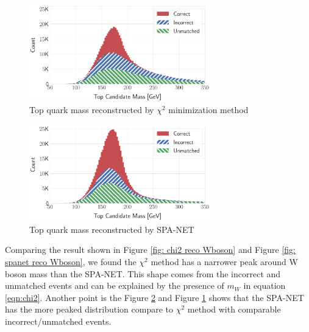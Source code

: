 \begin{figure}[H]
	\centering
	\includegraphics[width=0.7\textwidth]{Figures/network_t_quark_stacked_chi2.pdf}
	\caption{ Top quark mass reconstructed by $\chi^{2}$ minimization method}
	\label{fig: chi2 reco t quark}
\end{figure}
\begin{figure}[H]
	\centering
	\includegraphics[width=0.7\textwidth]{Figures/network_t_quark_stacked.pdf}
	\caption{ Top quark mass reconstructed by SPA-NET}
	\label{fig: spanet reco t quark}
\end{figure}
Comparing the result shown in Figure \ref{fig: chi2 reco Wboson} and Figure \ref{fig: spanet reco Wboson}, we found the $\chi^{2}$ method has a narrower peak around W boson mass than the SPA-NET. This shape comes from the incorrect and unmatched events and can be explained by the presence of $m_{W}$ in equation \ref{eqn:chi2}. Another point is the Figure \ref{fig: spanet reco t quark} and Figure \ref{fig: chi2 reco t quark} shows that the SPA-NET has the more peaked distribution compare to $\chi^{2}$ method with comparable incorrect/unmatched events.


